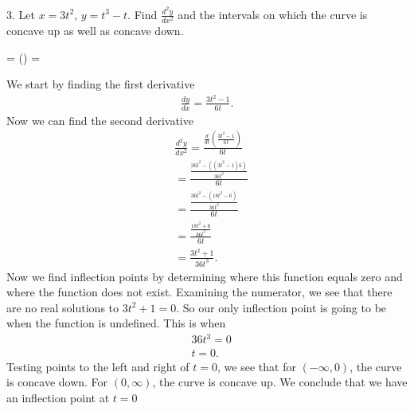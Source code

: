 \documentclass{report}
\begin{document}
    \pagebreak \bigbreak \noindent 
    \begin{mdframed}
        3. Let \( x = 3t^2 \), \( y = t^3 - t \). Find \(\frac{d^2y}{dx^2}\) and the intervals on which the curve is concave up as well as concave down.
    \end{mdframed}
    \bigbreak \noindent 
    \begin{remark}
         = \left(\right) = 
    \end{remark}
    
    \bigbreak \noindent 
    We start by finding the first derivative
    \begin{align*}
        \frac{dy}{dx} = \frac{3t^{2}-1}{6t}
    .\end{align*}
    \bigbreak \noindent 
    Now we can find the second derivative
    \begin{align*}
        &\frac{d^{2}y}{dx^{2}} = \frac{\frac{d}{dt}\left(\frac{3t^{2}-1}{6t}\right)}{6t} \\
        &=\frac{\frac{36t^{2}-((3t^{2}-1)6)}{36t^{2}}}{6t} \\
        &=\frac{\frac{36t^{2}-(18t^{2}-6)}{36t^{2}}}{6t} \\
        &=\frac{\frac{18t^{2}+6}{36t^{2}}}{6t} \\
        &=\frac{3t^{2}+1}{36t^{3}}
    .\end{align*}
    \bigbreak \noindent 
    Now we find inflection points by determining where this function equals zero and where the function does not exist. Examining the numerator, we see that there are no real solutions to $3t^{2} + 1 = 0$. So our only inflection point is going to be when the function is undefined. This is when 
    \begin{align*}
        &36t^{3} = 0 \\
        &t = 0
    .\end{align*}
    Testing points to the left and right of $t = 0$, we see that for $(-\infty, 0)$, the curve is concave down. For $(0,\infty)$, the curve is concave up. We conclude that we have an inflection point at $t=0$
\end{document}
